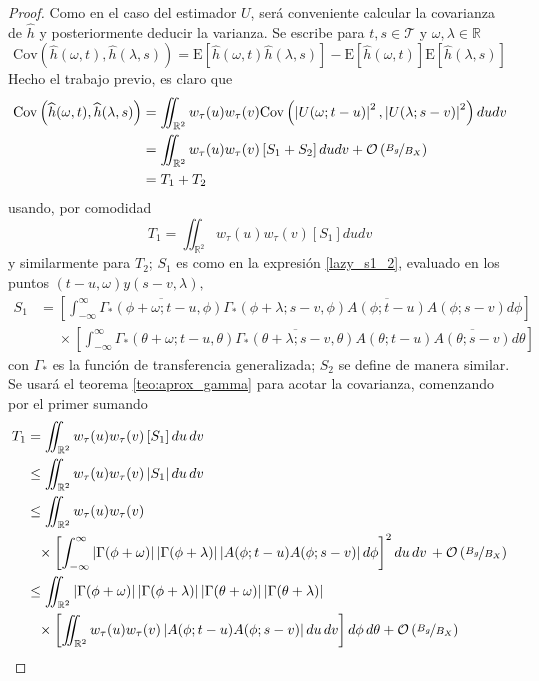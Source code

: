 \documentclass[12pt,letterpaper]{book}
\newcommand{\R}{\mathbb{R}}
\newcommand{\intR}{\int_{-\infty}^{\infty}}
\newcommand{\E}[1]{\mathrm{E}\left[ #1 \right]}
\newcommand{\Cov}[1]{\mathrm{Cov}\left( #1 \right)}
\newcommand{\abso}[1]{\left| #1 \right|}
\newcommand{\orden}[1]{\mathcal{O}\left( #1 \right)}
\newcommand{\pheq}{\phantom{=}}
\begin{document}
\begin{proof}
Como en el caso del estimador $U$, será conveniente calcular la covarianza de $\widehat{h}$ y posteriormente deducir la varianza. Se escribe para $t, s \in \mathcal{T}$ y $\omega, \lambda \in \R$
\begin{equation}
\Cov{\widehat{h}(\omega, t),\widehat{h}(\lambda, s)} = \E{\widehat{h}(\omega, t)\widehat{h}(\lambda, s)} - \E{\widehat{h}(\omega, t)}\E{\widehat{h}(\lambda, s)}
\end{equation}
Hecho el trabajo previo, es claro que
\begin{align*}
\Cov{\widehat{h}(\omega, t), \widehat{h}(\lambda, s)} &=
\iint_{\R^{2}} w_\tau(u) w_\tau(v) \Cov{\abso{U(\omega; t-u)}^{2},\abso{U(\lambda; s-v)}^{2}} du dv \\
&=
\iint_{\R^{2}} w_\tau(u) w_\tau(v) \left[ S_1 + S_2 \right] du dv + \orden{\nicefrac{B_g}{B_X}} \\
&= T_1 + T_2
\end{align*}
usando, por comodidad
\begin{equation}
T_1 = \iint_{\R^{2}} w_\tau(u) w_\tau(v) \left[ S_1 \right] du dv
\end{equation}
y similarmente para $T_2$; $S_1$ es como en la expresión \ref{lazy_s1_2}, evaluado en los puntos $(t-u,\omega) y (s-v, \lambda),$
\begin{align*}
S_1 &=
 \left[ \intR \overline{\Gamma_*(\phi + \omega; t-u, \phi)} \Gamma_*(\phi+ \lambda; s-v, \phi)
 \overline{A(\phi; t-u)} A(\phi; s-v) d\phi \right] \\
 &\pheq \times \left[ \intR \Gamma_*(\theta+ \omega; t-u, \theta) 
  \overline{\Gamma_*(\theta + \lambda; s-v, \theta)}  
 A(\theta; t-u)   \overline{A(\theta; s-v)} d\theta \right] 
\end{align*}
con $\Gamma_*$ es la función de transferencia generalizada; $S_2$ se define de manera similar.
Se usará el teorema \ref{teo:aprox_gamma} para acotar la covarianza, comenzando por el primer sumando
\begingroup
\allowdisplaybreaks
\begin{align*}
T_1 &= 
\iint_{\R^{2}} w_\tau(u) w_\tau(v) \left[ S_1 \right] du\, dv \\
&\leq
\iint_{\R^{2}} w_\tau(u) w_\tau(v) \abso{ S_1 } du\, dv \\
&\leq 
\iint_{\R^{2}} 
w_\tau(u) w_\tau(v) \\
&\pheq 
 \times \left[ \intR
 \abso{\Gamma(\phi + \omega)} \abso{\Gamma(\phi+ \lambda)}
 \abso{A(\phi; t-u) A(\phi; s-v)} d\phi \right]^{2}
 du\, dv\, + \orden{\nicefrac{B_g}{B_X}} \\
&\leq 
\iint_{\R^{2}} \abso{\Gamma(\phi + \omega)} \abso{\Gamma(\phi+ \lambda)}
\abso{\Gamma(\theta + \omega)} \abso{\Gamma(\theta+ \lambda)} \\
&\pheq 
 \times \left[ \iint_{\R^{2}}  w_\tau(u) w_\tau(v)
 \abso{A(\phi; t-u) A(\phi; s-v)} du\, dv \right]
 d\phi\, d\theta + \orden{\nicefrac{B_g}{B_X}}
\end{align*}
\endgroup
\end{proof}
\end{document}
